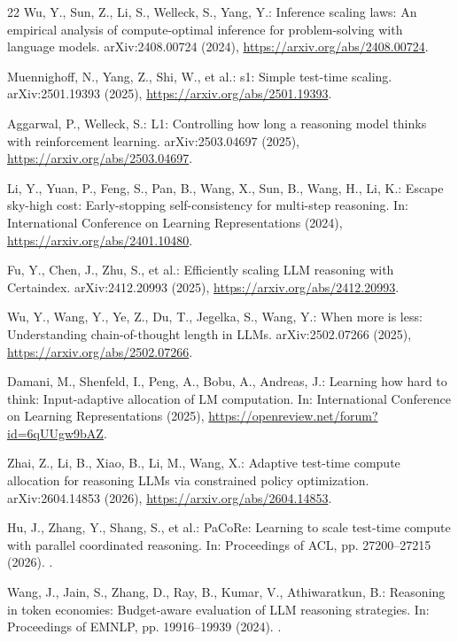 \begin{thebibliography}{22}
Wu, Y., Sun, Z., Li, S., Welleck, S., Yang, Y.: Inference scaling laws: An
empirical analysis of compute-optimal inference for problem-solving with
language models. arXiv:2408.00724 (2024),
\url{https://arxiv.org/abs/2408.00724}.

Muennighoff, N., Yang, Z., Shi, W., et al.: s1: Simple test-time scaling.
arXiv:2501.19393 (2025), \url{https://arxiv.org/abs/2501.19393}.

Aggarwal, P., Welleck, S.: L1: Controlling how long a reasoning model thinks
with reinforcement learning. arXiv:2503.04697 (2025),
\url{https://arxiv.org/abs/2503.04697}.

Li, Y., Yuan, P., Feng, S., Pan, B., Wang, X., Sun, B., Wang, H., Li, K.:
Escape sky-high cost: Early-stopping self-consistency for multi-step
reasoning. In: International Conference on Learning Representations (2024),
\url{https://arxiv.org/abs/2401.10480}.

Fu, Y., Chen, J., Zhu, S., et al.: Efficiently scaling LLM reasoning with
Certaindex. arXiv:2412.20993 (2025),
\url{https://arxiv.org/abs/2412.20993}.

Wu, Y., Wang, Y., Ye, Z., Du, T., Jegelka, S., Wang, Y.: When more is less:
Understanding chain-of-thought length in LLMs. arXiv:2502.07266 (2025),
\url{https://arxiv.org/abs/2502.07266}.

Damani, M., Shenfeld, I., Peng, A., Bobu, A., Andreas, J.: Learning how hard to
think: Input-adaptive allocation of LM computation. In: International
Conference on Learning Representations (2025),
\url{https://openreview.net/forum?id=6qUUgw9bAZ}.

Zhai, Z., Li, B., Xiao, B., Li, M., Wang, X.: Adaptive test-time compute
allocation for reasoning LLMs via constrained policy optimization.
arXiv:2604.14853 (2026), \url{https://arxiv.org/abs/2604.14853}.

Hu, J., Zhang, Y., Shang, S., et al.: PaCoRe: Learning to scale test-time
compute with parallel coordinated reasoning. In: Proceedings of ACL,
pp. 27200--27215 (2026). .

Wang, J., Jain, S., Zhang, D., Ray, B., Kumar, V., Athiwaratkun, B.:
Reasoning in token economies: Budget-aware evaluation of LLM reasoning
strategies. In: Proceedings of EMNLP, pp. 19916--19939 (2024).
.


\end{thebibliography}
